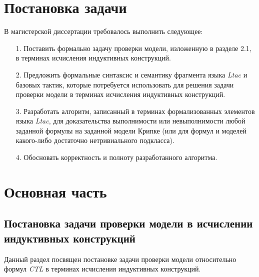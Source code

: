 \documentclass[12pt]{article}
\begin{document}
\newpage
\section{Постановка задачи}
В магистерской диссертации требовалось выполнить следующее:
\begin{enumerate}
    \item [1.] Поставить формально задачу проверки модели, изложенную в разделе 2.1, в терминах исчисления индуктивных конструкций.
    \item [2.] Предложить формальные синтаксис и семантику фрагмента языка \textit{Ltac} и базовых тактик, которые потребуется использовать для решения задачи проверки модели в терминах исчисления индуктивных конструкций.
    \item [3.] Разработать алгоритм, записанный в терминах формализованных элементов языка \textit{Ltac},  для доказательства выполнимости или невыполнимости любой заданной формулы на заданной модели Крипке (или для формул и моделей какого-либо достаточно нетривиального подкласса).
    \item[4.] Обосновать корректность и полноту разработанного алгоритма.
\end{enumerate}  
\section{Основная часть}
\subsection{Постановка задачи проверки модели в исчислении индуктивных конструкций}
Данный раздел посвящен постановке задачи проверки модели относительно формул \textit{CTL} в терминах исчисления индуктивных конструкций. 

\end{document}
